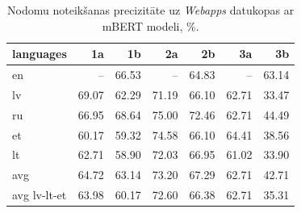 \begin{table}[htbp]
  \centering
  \caption{Nodomu noteikšanas precizitāte uz \textit{Webapps} datukopas ar mBERT modeli, \%.}
    \begin{tabular}{lrrrrrr}\toprule
    languages & 1a & 1b & 2a & 2b & 3a & 3b \\\midrule
    en    &  --   & \cellcolor[rgb]{ .843,  .886,  .949}66.53 &   --    & \cellcolor[rgb]{ .941,  .957,  .984}64.83 &   --    & \cellcolor[rgb]{ .984,  .969,  .98}63.14 \\
    lv    & \cellcolor[rgb]{ .698,  .784,  .898}69.07 & \cellcolor[rgb]{ .984,  .953,  .965}62.29 & \cellcolor[rgb]{ .576,  .698,  .855}71.19 & \cellcolor[rgb]{ .867,  .906,  .961}66.10 & \cellcolor[rgb]{ .984,  .961,  .973}62.71 & \cellcolor[rgb]{ .973,  .412,  .42}33.47 \\
    ru    & \cellcolor[rgb]{ .82,  .871,  .941}66.95 & \cellcolor[rgb]{ .722,  .8,  .906}68.64 & \cellcolor[rgb]{ .353,  .541,  .776}75.00 & \cellcolor[rgb]{ .502,  .647,  .831}72.46 & \cellcolor[rgb]{ .984,  .961,  .973}62.71 & \cellcolor[rgb]{ .976,  .62,  .627}44.49 \\
    et    & \cellcolor[rgb]{ .984,  .914,  .925}60.17 & \cellcolor[rgb]{ .984,  .898,  .91}59.32 & \cellcolor[rgb]{ .38,  .561,  .788}74.58 & \cellcolor[rgb]{ .867,  .906,  .961}66.10 & \cellcolor[rgb]{ .965,  .973,  .992}64.41 & \cellcolor[rgb]{ .973,  .506,  .514}38.56 \\
    lt    & \cellcolor[rgb]{ .984,  .961,  .973}62.71 & \cellcolor[rgb]{ .984,  .89,  .902}58.90 & \cellcolor[rgb]{ .525,  .663,  .839}72.03 & \cellcolor[rgb]{ .82,  .871,  .941}66.95 & \cellcolor[rgb]{ .984,  .929,  .941}61.02 & \cellcolor[rgb]{ .973,  .42,  .427}33.90 \\\midrule
    avg   & \cellcolor[rgb]{ .949,  .961,  .988}64.72 & \cellcolor[rgb]{ .984,  .969,  .98}63.14 & \cellcolor[rgb]{ .459,  .616,  .816}73.20 & \cellcolor[rgb]{ .8,  .855,  .933}67.29 & \cellcolor[rgb]{ .984,  .961,  .973}62.71 & \cellcolor[rgb]{ .976,  .584,  .592}42.71 \\
    avg lv-lt-et & \cellcolor[rgb]{ .988,  .988,  1}63.98 & \cellcolor[rgb]{ .984,  .914,  .925}60.17 & \cellcolor[rgb]{ .494,  .639,  .827}72.60 & \cellcolor[rgb]{ .851,  .894,  .953}66.38 & \cellcolor[rgb]{ .984,  .961,  .973}62.71 & \cellcolor[rgb]{ .973,  .443,  .451}35.31 \\\bottomrule
    \end{tabular}%
  \label{tab:webapps-bert}%
\end{table}%


